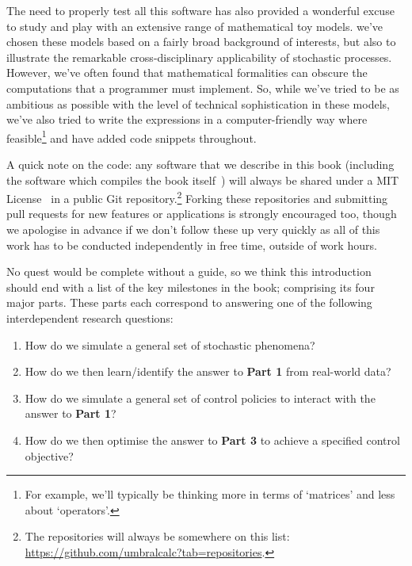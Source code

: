 \documentclass{book}
\begin{document}
The need to properly test all this software has also provided a wonderful excuse to study and play with an extensive range of mathematical toy models. we've chosen these models based on a fairly broad background of interests, but also to illustrate the remarkable cross-disciplinary applicability of stochastic processes. However, we've often found that mathematical formalities can obscure the computations that a programmer must implement. So, while we've tried to be as ambitious as possible with the level of technical sophistication in these models, we've also tried to write the expressions in a computer-friendly way where feasible\footnote{For example, we'll typically be thinking more in terms of `matrices' and less about `operators'.} and have added code snippets throughout.

A quick note on the code: any software that we describe in this book (including the software which compiles the book itself~\cite{diffusingideasbookgithub}) will always be shared under a MIT License~\cite{mitlicense} in a public Git repository.\footnote{The repositories will always be somewhere on this list: \href{https://github.com/umbralcalc?tab=repositories}{https://github.com/umbralcalc?tab=repositories}.} Forking these repositories and submitting pull requests for new features or applications is strongly encouraged too, though we apologise in advance if we don't follow these up very quickly as all of this work has to be conducted independently in free time, outside of work hours.

No quest would be complete without a guide, so we think this introduction should end with a list of the key milestones in the book; comprising its four major parts. These parts each correspond to answering one of the following interdependent research questions:

\begin{enumerate}[leftmargin=2.5\parindent] 
\item[{\bfseries\sffamily Part 1.}]{How do we simulate a general set of stochastic phenomena?}
\item[{\bfseries\sffamily Part 2.}]{How do we then learn/identify the answer to {\bfseries\sffamily Part 1} from real-world data?}
\item[{\bfseries\sffamily Part 3.}]{How do we simulate a general set of control policies to interact with the answer to {\bfseries\sffamily Part 1}?}
\item[{\bfseries\sffamily Part 4.}]{How do we then optimise the answer to {\bfseries\sffamily Part 3} to achieve a specified control objective?} 
\end{enumerate}
\end{document}
